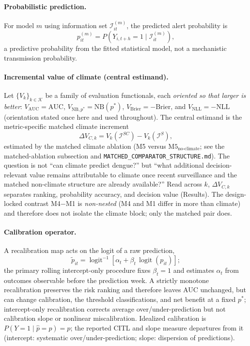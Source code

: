 \documentclass[11pt,a4paper]{article}
\begin{document}
\paragraph{Probabilistic prediction.}
For model $m$ using information set $\mathcal I^{(m)}_{it}$, the predicted alert probability is
\[
p^{(m)}_{it}=P\!\left(Y_{i,t+h}=1\mid \mathcal I^{(m)}_{it}\right),
\]
a predictive probability from the fitted statistical model, not a mechanistic transmission probability.

\paragraph{Incremental value of climate (central estimand).}
Let $\{V_k\}_{k\in\mathcal K}$ be a family of evaluation functionals, each \emph{oriented so that larger is better}: $V_{\mathrm{AUC}}=\mathrm{AUC}$, $V_{\mathrm{NB},p^*}=\mathrm{NB}(p^*)$, $V_{\mathrm{Brier}}=-\mathrm{Brier}$, and $V_{\mathrm{NLL}}=-\mathrm{NLL}$ (orientation stated once here and used throughout). The central estimand is the metric-specific matched climate increment
\[
\Delta V_{C,k}=V_k(\mathcal I^{SC})-V_k(\mathcal I^{S}),
\]
estimated by the matched climate ablation (M5 versus $\text{M5}_{\text{no-climate}}$; see the matched-ablation subsection and \texttt{MATCHED\_COMPARATOR\_STRUCTURE.md}). The question is not ``can climate predict dengue?'' but ``what additional decision-relevant value remains attributable to climate once recent surveillance and the matched non-climate structure are already available?'' Read across $k$, $\Delta V_{C,k}$ separates ranking, probability accuracy, and decision value (Results). The design-locked contrast M4$-$M1 is \emph{non-nested} (M4 and M1 differ in more than climate) and therefore does not isolate the climate block; only the matched pair does.

\paragraph{Calibration operator.}
A recalibration map acts on the logit of a raw prediction,
\[
\widetilde p_{it}=\operatorname{logit}^{-1}\!\left[\alpha_t+\beta_t\,\operatorname{logit}(p_{it})\right];
\]
the primary rolling intercept-only procedure fixes $\beta_t=1$ and estimates $\alpha_t$ from outcomes observable before the prediction week. A strictly monotone recalibration preserves the risk ranking and therefore leaves AUC unchanged, but can change calibration, the threshold classifications, and net benefit at a fixed $p^*$; intercept-only recalibration corrects average over/under-prediction but not calibration slope or nonlinear miscalibration. Idealized calibration is $P(Y=1\mid \hat p=p)=p$; the reported CITL and slope measure departures from it (intercept: systematic over/under-prediction; slope: dispersion of predictions).
\end{document}
